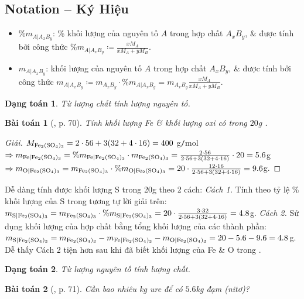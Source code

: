 \documentclass{article}
\newtheorem{baitoan}{Bài toán}
\newtheorem{dangtoan}{Dạng toán}
\begin{document}
\subsection*{Notation -- Ký Hiệu}

\begin{itemize}
	\item $\%m_{A|A_xB_y}$: \% khối lượng của nguyên tố $A$ trong hợp chất $A_xB_y$, \& được tính bởi công thức $\%m_{A|A_xB_y}\coloneqq\frac{xM_A}{xM_A + yM_B}$.
	\item $m_{A|A_xB_y}$: khối lượng của nguyên tố $A$ trong hợp chất $A_xB_y$, \& được tính bởi công thức $m_{A|A_xB_y}\coloneqq m_{A_xB_y}\cdot\%m_{A|A_xB_y} = m_{A_xB_y}\frac{xM_A}{xM_A + yM_B}$.
\end{itemize}

\begin{dangtoan}
	Từ lượng chất tính lượng nguyên tố.
\end{dangtoan}

\begin{baitoan}[\cite{Tuan2022}, p. 70]
	Tính khối lượng \emph{Fe} \& khối lượng oxi có trong $20$\emph{g} \emph{}.
\end{baitoan}

\begin{proof}[Giải]
	$M_{\ce{Fe2(SO4)3}} = 2\cdot56 + 3(32 + 4\cdot16) = 400$ g\texttt{/}mol$\Rightarrow m_{\ce{Fe|Fe2(SO4)3}} = \%m_{\ce{Fe|Fe2(SO4)3}}\cdot m_{\ce{Fe2(SO4)3}} = \frac{2\cdot56}{2\cdot56 + 3(32 + 4\cdot16)}\cdot20 = 5.6$g$\Rightarrow m_{\ce{O|Fe2(SO4)3}} = m_{\ce{Fe2(SO4)3}}\cdot\%m_{\ce{O|Fe2(SO4)3}} = 20\cdot\frac{12\cdot16}{2\cdot56 + 3(32 + 4\cdot16)} = 9.6$g.
\end{proof}
Dễ dàng tính được khối lượng S trong 20g  theo 2 cách: \textit{Cách 1.} Tính theo tỷ lệ \% khối lượng của S trong  tương tự lời giải trên: $m_{\ce{S|Fe2(SO4)3}} = m_{\ce{Fe2(SO4)3}}\cdot\%m_{\ce{S|Fe2(SO4)3}} = 20\cdot\frac{3\cdot32}{2\cdot56 + 3(32 + 4\cdot16)} = 4.8$g. \textit{Cách 2.} Sử dụng khối lượng của hợp chất bằng tổng khối lượng của các thành phần: $m_{\ce{S|Fe2(SO4)3}} = m_{\ce{Fe2(SO4)3}} - m_{\ce{Fe|Fe2(SO4)3}} - m_{\ce{O|Fe2(SO4)3}} = 20 - 5.6 - 9.6 = 4.8$g. Dễ thấy Cách 2 tiện hơn sau khi đã biết khối lượng của Fe \& O trong .

\begin{dangtoan}
	Từ lượng nguyên tố tính lượng chất.
\end{dangtoan}

\begin{baitoan}[\cite{Tuan2022}, p. 71]
	Cần bao nhiêu \emph{kg} ure \emph{} để có $5.6$\emph{kg} đạm (nitơ)?
\end{baitoan}
\end{document}
